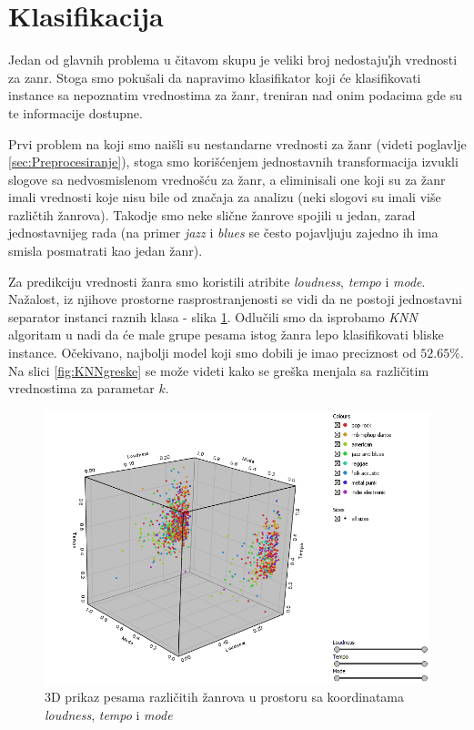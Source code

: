 \section{Klasifikacija}
\label{sec:Klasifikacija}

Jedan od glavnih problema u \v{c}itavom skupu je veliki broj nedostaju\c'{}ih vrednosti za zanr. Stoga smo poku\v{s}ali da napravimo klasifikator koji \'c{}e klasifikovati instance sa nepoznatim vrednostima za \v{z}anr, treniran nad onim podacima gde su te informacije dostupne.

Prvi problem na koji smo nai\v{s}li su nestandarne vrednosti za \v{z}anr (videti poglavlje \ref{sec:Preprocesiranje}), stoga smo kori\v{s}\'c{}enjem jednostavnih transformacija izvukli slogove sa nedvosmislenom vredno\v{s}\'c{}u za \v{z}anr, a eliminisali one koji su za \v{z}anr imali vrednosti koje nisu bile od zna\v{c}aja za analizu (neki slogovi su imali vi\v{s}e razli\v{c}tih \v{z}anrova). Takodje smo neke sli\v{c}ne \v{z}anrove spojili u jedan, zarad jednostavnijeg rada (na primer \emph{jazz} i \emph{blues} se \v{c}esto pojavljuju zajedno ih ima smisla posmatrati kao jedan \v{z}anr).

Za predikciju vrednosti \v{z}anra smo koristili atribite \emph{loudness}, \emph{tempo} i \emph{mode}. Na\v{z}alost, iz njihove prostorne rasprostranjenosti se vidi da ne postoji jednostavni separator instanci raznih klasa - slika \ref{fig:ZanrKlasifikacija}. Odlu\v{c}ili smo da isprobamo \emph{KNN} algoritam u nadi da \'c{}e male grupe pesama istog \v{z}anra lepo klasifikovati bliske instance. O\v{c}ekivano, najbolji model koji smo dobili je imao preciznost od $52.65\%$. Na slici \ref{fig:KNNgreske} se mo\v{z}e videti kako se gre\v{s}ka menjala sa razli\v{c}itim vrednostima za parametar $k$.

\begin{figure}[H]
    \centering
    \includegraphics[scale=0.6]{resources/genre_scatter.PNG}
    \caption{3D prikaz pesama razli\v{c}itih \v{z}anrova u prostoru sa koordinatama \emph{loudness}, \emph{tempo} i \emph{mode}}
    \label{fig:ZanrKlasifikacija}
\end{figure}

